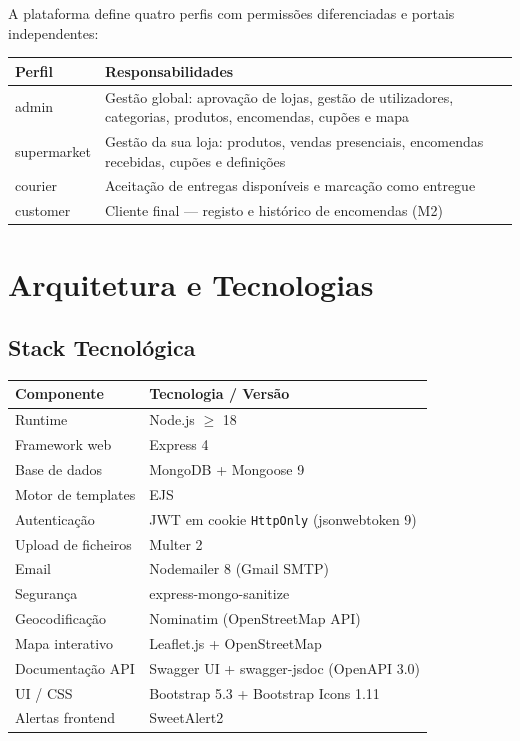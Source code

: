 \documentclass[12pt,a4paper]{article}
\begin{document}
A plataforma define quatro perfis com permissões diferenciadas e portais independentes:

\begin{center}
\begin{tabular}{>{\ttfamily}lp{9cm}}
\toprule
\textbf{Perfil} & \textbf{Responsabilidades} \\
\midrule
admin       & Gestão global: aprovação de lojas, gestão de utilizadores, categorias, produtos, encomendas, cupões e mapa \\
supermarket & Gestão da sua loja: produtos, vendas presenciais, encomendas recebidas, cupões e definições \\
courier     & Aceitação de entregas disponíveis e marcação como entregue \\
customer    & Cliente final — registo e histórico de encomendas (M2) \\
\bottomrule
\end{tabular}
\end{center}

\section{Arquitetura e Tecnologias}

\subsection{Stack Tecnológica}

\begin{center}
\begin{tabular}{ll}
\toprule
\textbf{Componente}      & \textbf{Tecnologia / Versão} \\
\midrule
Runtime                  & Node.js $\geq$ 18 \\
Framework web            & Express 4 \\
Base de dados            & MongoDB + Mongoose 9 \\
Motor de templates       & EJS \\
Autenticação             & JWT em cookie \texttt{HttpOnly} (jsonwebtoken 9) \\
Upload de ficheiros      & Multer 2 \\
Email                    & Nodemailer 8 (Gmail SMTP) \\
Segurança                & express-mongo-sanitize \\
Geocodificação           & Nominatim (OpenStreetMap API) \\
Mapa interativo          & Leaflet.js + OpenStreetMap \\
Documentação API         & Swagger UI + swagger-jsdoc (OpenAPI 3.0) \\
UI / CSS                 & Bootstrap 5.3 + Bootstrap Icons 1.11 \\
Alertas frontend         & SweetAlert2 \\
\bottomrule
\end{tabular}
\end{center}
\end{document}
